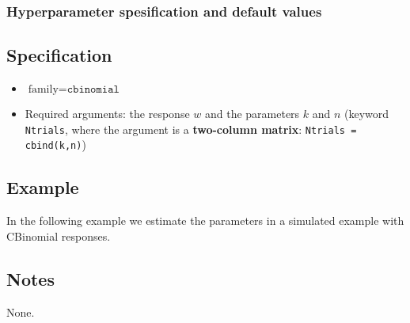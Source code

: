 \documentclass[a4paper,11pt]{article}
\begin{document}
\subsubsection*{Hyperparameter spesification and default values}


\subsection*{Specification}

\begin{itemize}
\item $\text{family}=\texttt{cbinomial}$
\item Required arguments: the response $w$ and the parameters $k$ and
    $n$ (keyword \texttt{Ntrials}, where the argument is a
    \textbf{two-column matrix}: \texttt{Ntrials = cbind(k,n)})
\end{itemize}

\subsection*{Example}

In the following example we estimate the parameters in a simulated
example with CBinomial responses.%


\subsection*{Notes}

None.
\end{document}
